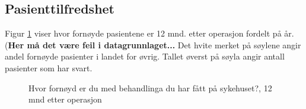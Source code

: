 \documentclass [norsk,a4paper,twoside]{article}\usepackage[]{graphicx}\usepackage[]{color}
\begin{document}
\subsection{Pasienttilfredshet}

Figur \ref{fig:Fornoyd} viser hvor fornøyde pasientene er 12 mnd. 
etter operasjon fordelt på år. (\textbf{Her må det være feil i datagrunnlaget...} Det hvite merket på søylene angir andel fornøyde pasienter i landet for øvrig. Tallet øverst på søyla angir antall pasienter som har svart. 


\begin{figure}[h] 
	\begin{center}
	\end{center}
  \caption{Hvor fornøyd er du med behandlinga du har fått på sykehuset?, 12 mnd etter operasjon}
  \label{fig:Fornoyd}
\end{figure}
\end{document}
